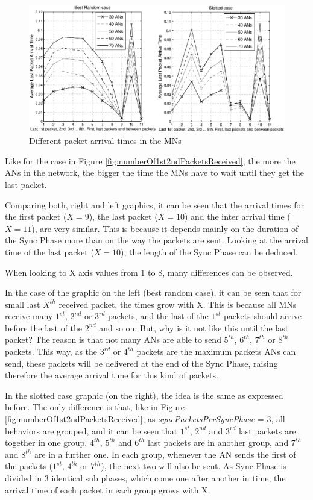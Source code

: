 \begin{figure}[ht]
 \begin{center}
  \includegraphics[width=1\textwidth]{Lastarrivalpackettimes.eps}
 \end{center}
 \caption{Different packet arrival times in the \acp{MN}}
 \label{fig:Lastarrivalpackettimes}
\end{figure}

Like for the case in Figure \ref{fig:numberOf1st2ndPacketsReceived}, the more the \acp{AN} in the network, the bigger the time the \acp{MN} have to wait 
until they get the last packet.

Comparing both, right and left graphics, it can be seen that the arrival times for the first packet ($X=9$), the last packet ($X=10$) and the inter arrival 
time ($X=11$), are very similar. This is because it depends mainly on the duration of the Sync Phase more than on the way the packets are sent. 
Looking at the arrival time of the last packet ($X=10$), the length of the Sync Phase can be deduced.

When looking to X axis values from 1 to 8, many differences can be observed.

In the case of the graphic on the left (best random case), it can be seen that for small last $X^{th}$ received packet, the times grow with X. 
This is because all \acp{MN} receive many $1^{st}$, $2^{nd}$ or $3^{rd}$ packets, and the last of the $1^{st}$ packets should arrive 
before the last of the $2^{nd}$ and so on. But, why is it not like this until the last packet? The reason is that not many \acp{AN} are able to send
$5^{th}$, $6^{th}$, $7^{th}$ or $8^{th}$ packets. This way, as the $3^{rd}$ or $4^{th}$ packets are the maximum packets \acp{AN} can send, 
these packets will be delivered at the end of the Sync Phase, raising therefore the average arrival time for this kind of packets.

In the slotted case graphic (on the right), the idea is the same as expressed before. The only difference is that, like in Figure 
\ref{fig:numberOf1st2ndPacketsReceived}, as \textit{syncPacketsPerSyncPhase} = 3, all behaviors are grouped, and it can be seen that $1^{st}$, 
$2^{nd}$ and $3^{rd}$ last packets are together in one group. $4^{th}$, $5^{th}$ and $6^{th}$ last packets are in another group, and 
$7^{th}$ and $8^{th}$ are in a further one. In each group, whenever the \ac{AN} sends the first of the packets ($1^{st}$, $4^{th}$ or $7^{th}$), the 
next two will also be sent. As Sync Phase is divided in 3 identical sub phases, which come one after another in time, the arrival time of 
each packet in each group grows with X.

